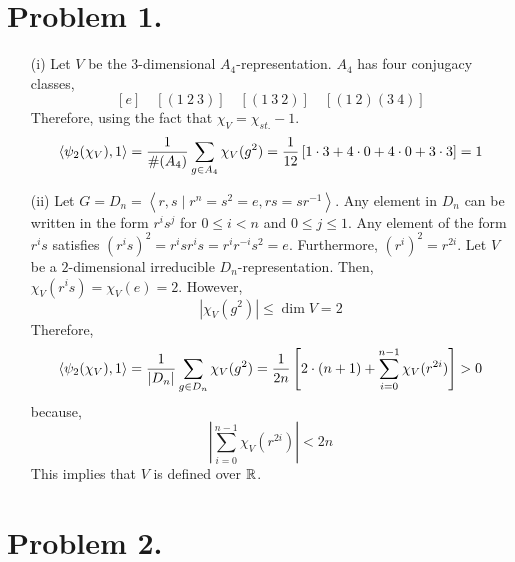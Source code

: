 \documentclass[12pt]{extarticle}
\begin{document}

\section*{Problem 1.}
\begin{enumerate}
\item[(i)]
Let $V$ be the 3-dimensional $A_4$-representation. 
$A_4$ has four conjugacy classes,
\[ [e] \quad [(1 \: 2 \: 3)] \quad [(1 \: 3 \: 2)] \quad [(1 \: 2) (3 \: 4)] \]
Therefore, using the fact that $\chi_V = \chi_{st.}  - 1$.
\[ \left< \psi_2(\chi_V), 1 \right> = \frac{1}{\#(A_4)} \sum_{g \in A_4} \chi_V(g^2) = \frac{1}{12} \left[ 1 \cdot 3 + 4 \cdot 0 + 4 \cdot 0 + 3 \cdot 3 \right] = 1 \]
\item[(ii)]
Let $G = D_n = \left< r, s \mid r^n = s^2 = e, rs = sr^{-1} \right>$. Any element in $D_n$ can be written in the form $r^i s^j$ for $0 \le i < n$ and $0 \le j \le 1$. Any element of the form $r^i s$ satisfies $(r^i s)^2 = r^i s r^i s = r^i r^{-i} s^2 = e$. Furthermore, $(r^i)^2 = r^{2i}$. Let $V$ be a $2$-dimensional irreducible $D_n$-representation. Then, $\chi_V(r^i s) = \chi_V(e) = 2$. However, 
\[ | \chi_V(g^2) | \le \dim{V} = 2 \]
Therefore, 
\[ \left< \psi_2(\chi_V), 1 \right> = \frac{1}{|D_n|} \sum_{g \in D_n} \chi_V(g^2) = \frac{1}{2n} \left[ 2 \cdot (n + 1) + \sum_{i = 0}^{n-1} \chi_V(r^{2 i}) \right] > 0 \]
because,
\[ \left| \sum_{i = 0}^{n-1} \chi_V(r^{2 i}) \right| < 2n \]
This implies that $V$ is defined over $\mathbb{R}$.

\end{enumerate}

\section*{Problem 2.}
\end{document}
